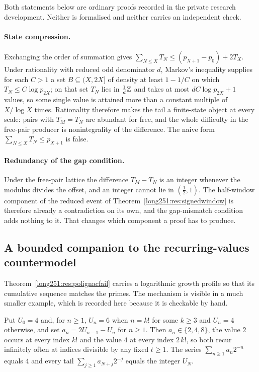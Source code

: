 \documentclass[11pt]{article}
\begin{document}
Both statements below are ordinary proofs recorded in the private research
development.  Neither is formalised and neither carries an independent check.

\paragraph{State compression.}  Exchanging the order of summation gives
$\sum_{N\le X}T_N\le(p_{X+1}-p_0)+2T_X$.  Under rationality with reduced odd
denominator $d$, Markov's inequality supplies for each $C>1$ a set
$B\subseteq(X,2X]$ of density at least $1-1/C$ on which $T_N\le C\log p_{2X}$;
on that set $T_N$ lies in $\tfrac1d\mathbb{Z}$ and takes at most $dC\log p_{2X}+1$
values, so some single value is attained more than a constant multiple of
$X/\log X$ times.  Rationality therefore makes the tail a finite-state object
at every scale: pairs with $T_M=T_N$ are abundant for free, and the whole
difficulty in the free-pair producer is nonintegrality of the difference.  The
naive form $\sum_{N\le X}T_N\le p_{X+1}$ is false.

\paragraph{Redundancy of the gap condition.}  Under the free-pair lattice the
difference $T_M-T_N$ is an integer whenever the modulus divides the offset, and
an integer cannot lie in $(\tfrac12,1)$.  The half-window component of the
reduced event of Theorem~\ref{long251:res:signedwindow} is therefore already a
contradiction on its own, and the gap-mismatch condition adds nothing to it.
That changes which component a proof has to produce.

\subsection{A bounded companion to the recurring-values countermodel}
\label{long251:sec:xr-boundedpolignac}

Theorem~\ref{long251:res:polignacfail} carries a logarithmic growth profile so that its
cumulative sequence matches the primes.  The mechanism is visible in a much
smaller example, which is recorded here because it is checkable by hand.

\begin{proposition}\label{long251:xr:boundedpolignac}
Put $U_0=4$ and, for $n\ge1$, $U_n=6$ when $n=k!$ for some $k\ge3$ and $U_n=4$
otherwise, and set $a_n=2U_{n-1}-U_n$ for $n\ge1$.  Then $a_n\in\{2,4,8\}$,
the value $2$ occurs at every index $k!$ and the value $4$ at every index
$2\,k!$, so both recur infinitely often at indices divisible by any fixed
$t\ge1$.  The series $\sum_{n\ge1}a_n2^{-n}$ equals $4$ and every tail
$\sum_{j\ge1}a_{N+j}2^{-j}$ equals the integer $U_N$.
\end{proposition}
\end{document}
